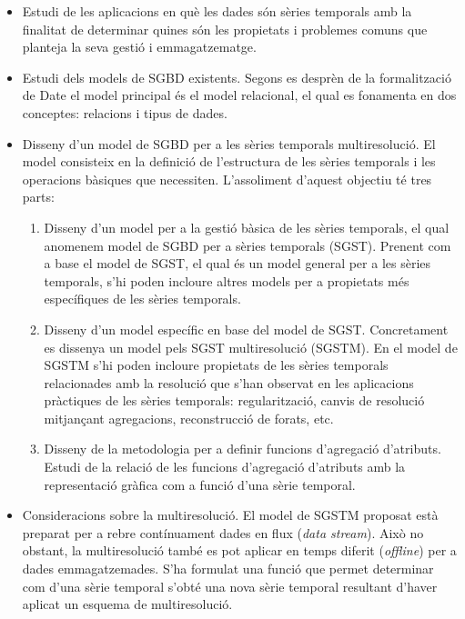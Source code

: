 \documentclass{article}
\begin{document}
\begin{itemize}

\item Estudi de les aplicacions en què les dades són sèries temporals
  amb la finalitat de determinar quines són les propietats i problemes
  comuns que planteja la seva gestió i emmagatzematge.

\item Estudi dels models de SGBD existents. Segons es desprèn de la
  formalització de Date%
  el model principal és el model relacional, el qual es fonamenta en
  dos conceptes: relacions i tipus de dades.


\item Disseny d'un model de SGBD per a les sèries temporals
  multiresolució. El model consisteix en la definició de l'estructura de les
  sèries temporals i les operacions bàsiques que necessiten.
  L'assoliment d'aquest objectiu té tres parts:

  \begin{enumerate}
  \item Disseny d'un model per a la gestió bàsica de les sèries
    temporals, el qual anomenem model de SGBD per a sèries temporals
    (SGST).  
    Prenent com a base el model de SGST, el qual és un model general
    per a les sèries temporals, s'hi poden incloure altres models per
    a propietats més específiques de les sèries temporals.

  \item Disseny d'un model específic en base del model de
    SGST. Concretament es dissenya un model pels SGST multiresolució
    (SGSTM).  En el model de SGSTM s'hi poden incloure propietats de
    les sèries temporals relacionades amb la resolució que s'han
    observat en les aplicacions pràctiques de les sèries temporals:
    regularització, canvis de resolució mitjançant agregacions,
    reconstrucció de forats, etc.
 
  \item Disseny de la metodologia per a definir funcions d'agregació
    d'atributs. Estudi de la relació de les funcions d'agregació
    d'atributs amb la representació gràfica com a funció d'una sèrie
    temporal.


  \end{enumerate}

\item Consideracions sobre la multiresolució.  El model de SGSTM
  proposat està preparat per a rebre contínuament dades en flux
  (\emph{data stream}). Això no obstant, la multiresolució també es
  pot aplicar en temps diferit (\emph{offline}) per a dades
  emmagatzemades. S'ha formulat una funció que permet determinar com
  d'una sèrie temporal s'obté una nova sèrie temporal resultant
  d'haver aplicat un esquema de multiresolució.


\end{itemize}
\end{document}
